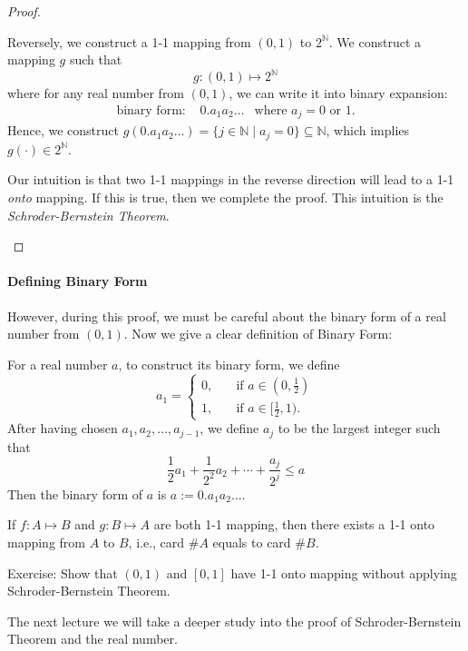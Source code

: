 \begin{proof}
\begin{enumerate}
Reversely, we construct a 1-1 mapping from $(0,1)$ to $2^{\mathbb{N}}$. We construct a mapping $g$ such that
\[
g:(0,1)\mapsto2^{\mathbb{N}}
\]
where for any real number from $(0,1)$, we can write it into binary expansion:
\[
\begin{array}{lll}
\mbox{binary form: }
&
0.a_1a_2\dots
&
\mbox{where }a_j=0\mbox{ or }1.
\end{array}
\]
Hence, we construct $g(0.a_1a_2\dots) = \{j\in\mathbb{N}\mid a_j=0\}\subseteq\mathbb{N}$, which implies $g(\cdot)\in2^{\mathbb{N}}$.
\begin{remark}
Our intuition is that two 1-1 mappings in the reverse direction will lead to a 1-1 \emph{onto} mapping. If this is true, then we complete the proof. This intuition is the \emph{Schroder-Bernstein Theorem}.
\end{remark}
\end{enumerate}
\end{proof}
\paragraph{Defining Binary Form} However, during this proof, we must be careful about the binary form of a real number from $(0,1)$. Now we give a clear definition of Binary Form:

For a real number $a$, to construct its binary form, we define
\[
a_1=\left\{
\begin{aligned}
0,&\quad\mbox{if }a\in(0,\frac{1}{2})\\
1,&\quad\mbox{if }a\in[\frac{1}{2},1).
\end{aligned}
\right.
\]
After having chosen $a_1,a_2,\dots,a_{j-1}$, we define $a_j$ to be the largest integer such that
\[
\frac{1}{2}a_1+\frac{1}{2^2}a_2+\cdots+\frac{a_j}{2^j}\le a
\]
Then the binary form of $a$ is $a:=0.a_1a_2\dots$.
\begin{theorem}
If $f:A\mapsto B$ and $g:B\mapsto A$ are both 1-1 mapping, then there exists a 1-1 onto mapping from $A$ to $B$, i.e., card $\# A$ equals to card $\# B$.
\end{theorem}
Exercise: Show that $(0,1)$ and $[0,1]$ have 1-1 onto mapping without applying Schroder-Bernstein Theorem.

The next lecture we will take a deeper study into the proof of Schroder-Bernstein Theorem and the real number.













